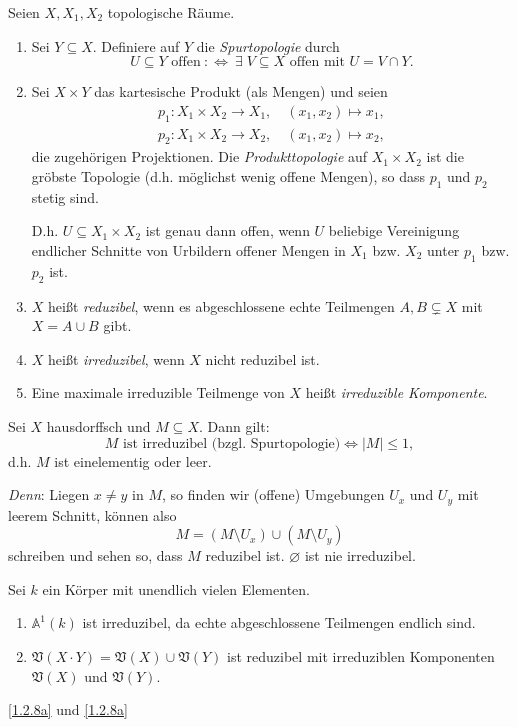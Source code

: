 \documentclass[a4paper,12pt]{scrbook}
\theoremstyle{blah}
\theoremstyle{stz}
\def\A{\mathbb{A}}
\def\V{\mathfrak{V}}
\newcommand{\leer}{\ensuremath{\varnothing}}
\newcommand{\card}[1]{|#1|}
\renewcommand{\mapsto}{\longmapsto}
\begin{document}
\begin{de}\label{1.2.6} Seien $X,X_{1},X_{2}$ topologische Räume.
\begin{enumerate}
\item Sei $Y\subseteq X$. Definiere auf $Y$ die \emph{Spurtopologie} durch
\[U\subseteq Y\text{ offen}\: :\Longleftrightarrow\:\exists\;V\subseteq X\text{ offen mit }U=V\cap Y.\]
\item Sei $X\times Y$ das kartesische Produkt (als Mengen) und seien
\begin{align*}p_{1}\colon X_{1}\times X_{2}\rightarrow X_{1},\quad(x_{1},x_{2})\mapsto x_{1},\\p_{2}\colon X_{1}\times X_{2}\rightarrow X_{2},\quad(x_{1},x_{2})\mapsto x_{2},\end{align*}
die zugehörigen Projektionen. Die \emph{Produkttopologie} auf $X_{1}\times X_{2}$ ist die gröbste Topologie (d.h. möglichst wenig offene Mengen), so dass $p_{1}$ und $p_{2}$ stetig sind.

D.h. $U\subseteq X_{1}\times X_{2}$ ist genau dann offen, wenn $U$ beliebige Vereinigung endlicher Schnitte von Urbildern offener Mengen in $X_{1}$ bzw. $X_{2}$ unter $p_{1}$ bzw. $p_{2}$ ist.

\item $X$ heißt \emph{reduzibel}, wenn es abgeschlossene echte Teilmengen $A,B\subsetneq X$ mit $X=A\cup B$ gibt.

\item $X$ heißt \emph{irreduzibel}, wenn $X$ nicht reduzibel ist.

\item Eine maximale irreduzible Teilmenge von $X$ heißt \emph{irreduzible Komponente}.
\end{enumerate}\end{de}

\begin{bsp}\label{1.2.7}
Sei $X$ hausdorffsch und $M\subseteq X$. Dann gilt:
\[M\text{ ist irreduzibel (bzgl. Spurtopologie)}\iff \card{M}\leq 1,\]
d.h. $M$ ist einelementig oder leer.

\emph{Denn}: Liegen $x\neq y$ in $M$, so finden wir (offene) Umgebungen $U_{x}$ und $U_{y}$ mit leerem Schnitt, können also
\[M=(M\setminus U_{x})\cup(M\setminus U_{y})\]
schreiben und sehen so, dass $M$ reduzibel ist. $\leer$ ist nie irreduzibel.
\end{bsp}

\begin{bsp}\label{1.2.8} Sei $k$ ein Körper mit unendlich vielen Elementen.
\begin{enumerate}
\item\label{1.2.8a} $\A^{1}(k)$ ist irreduzibel, da echte abgeschlossene Teilmengen endlich sind.
\item $\V(X\cdot Y) = \V(X)\cup\V(Y)$ ist reduzibel mit irreduziblen Komponenten $\V(X)$ und $\V(Y)$.
\end{enumerate}\end{bsp}
\ref{1.2.8a} und \autoref{1.2.8a}
\end{document}
